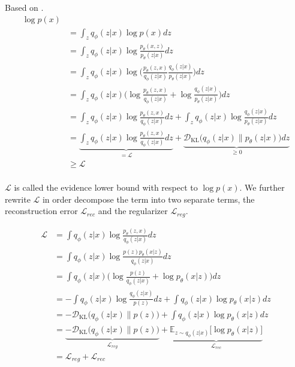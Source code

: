 Based on \cite[p.~698]{deeplearning:2016}.
\begin{align*}
  \log p(x)\\
  &= \int_z q_\phi(z|x) \log p(x) dz\\
  &= \int_z q_\phi(z|x) \log \frac{p_\theta(x,z)}{p_\theta(z|x)} dz \tag{Bayes' rule}\\
  &= \int_z q_\phi(z|x) \log\bigg(\frac{p_\theta(z,x)}{q_\phi(z|x)} \frac{q_\phi(z|x)}{p_\theta(z|x)}\bigg) dz \tag{Chain rule}\\
  &= \int_z q_\phi(z|x) \bigg(\log\frac{p_\theta(z,x)}{q_\phi(z|x)} + \log\frac{q_\phi(z|x)}{p_\theta(z|x)}\bigg) dz\\
  &= \int_z q_\phi(z|x) \log \frac{p_\theta(z,x)}{q_\phi(z|x)} dz + \int_z q_\phi(z|x) \log\frac{q_\phi(z|x)}{p_\theta(z|x)} dz\\
  &= \underbrace{\int_z q_\phi(z|x) \log \frac{p_\theta(z,x)}{q_\phi(z|x)} dz}_{= \mathcal{L}}+ \underbrace{\mathcal{D}_{\mathrm{KL}}\big(q_\phi(z|x) \| p_\theta(z|x)\big) dz}_{\geq 0}\\
  &\geq \mathcal{L}\\
\end{align*}

$\mathcal{L}$ is called the evidence lower bound with respect to $\log p(x)$.
We further rewrite $\mathcal{L}$ in order decompose the term into two separate terms, the reconstruction error $\mathcal{L}_{rec}$ and the regularizer $\mathcal{L}_{reg}$.

\begin{align*}
  \mathcal{L}
  &= \int q_\phi(z|x) \log\frac{p_\theta(z,x)}{q_\phi(z|x)} dz\\
  &= \int q_\phi(z|x) \log\frac{p(z) p_\theta(x|z)}{q_\phi(z|x)} \tag{we assume that x is conditionally dependent on z} dz\\
  &= \int q_\phi(z|x) \bigg(\log\frac{p(z)}{q_\phi(z|x)} + \log p_\theta(x|z)\bigg) dz\\
  &= -\int q_\phi(z|x) \log\frac{q_\phi(z|x)}{p(z)} dz + \int q_\phi(z|x) \log p_\theta(x|z) dz\\
  &= -\mathcal{D}_{\mathrm{KL}}\big(q_\phi(z|x) \| p(z)\big) + \int q_\phi(z|x) \log p_\theta(x|z) dz\\
  &= \underbrace{-\mathcal{D}_{\mathrm{KL}}\big(q_\phi(z|x) \| p(z)\big)}_{\mathcal{L}_{reg}} + \underbrace{\mathbb{E}_{z \sim q_\phi(z|x)}\big[ \log p_\theta(x|z)\big]}_{\mathcal{L}_{rec}}\\
  &= \mathcal{L}_{reg} + \mathcal{L}_{rec}
\end{align*}

